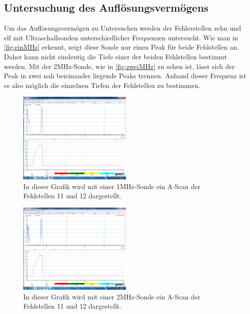 \subsection{Untersuchung des Auflösungsvermögens}
\label{subsec:auflösung}
Um das Auflösungsvermögen zu Untersuchen werden der Fehlerstellen zehn und elf mit Ultraschallsonden unterschiedlicher Frequenzen untersucht.
Wie man in \autoref{fig:einMHz} erkennt, zeigt diese Sonde nur einen Peak für beide Fehlstellen an. Daher kann nicht eindeutig die Tiefe einer der beiden Fehlstellen bestimmt werden.
Mit der 2MHz-Sonde, wie in \autoref{fig:zweiMHz} zu sehen ist, lässt sich der Peak in zwei nah beieinander liegende Peaks trennen. Anhand dieser Frequenz ist es also möglich 
die einzelnen Tiefen der Fehlstellen zu bestimmen.
\begin{figure}
  \centering
\includegraphics[width=0.5\textwidth]{content/einMHz.pdf}
  \caption{In dieser Grafik wird mit einer 1MHz-Sonde ein A-Scan der Fehlstellen 11 und 12 dargestellt.}
  \label{fig:einMHz}
\end{figure}
\begin{figure}
  \centering
\includegraphics[width=0.5\textwidth]{content/2MHz (unten).pdf}
  \caption{In dieser Grafik wird mit einer 2MHz-Sonde ein A-Scan der Fehlstellen 11 und 12 dargestellt.}
  \label{fig:zweiMHz}
\end{figure}